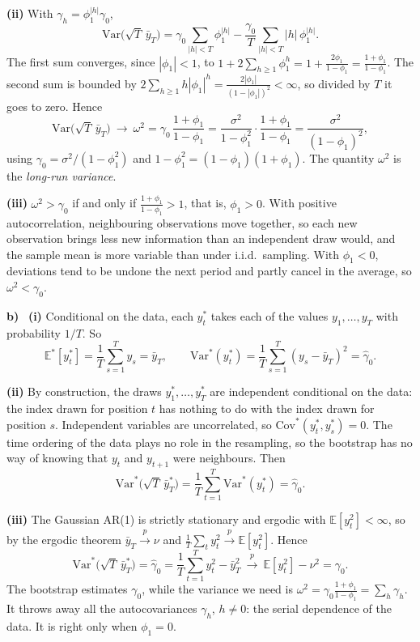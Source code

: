 \documentclass[11pt]{article}
\newcommand{\E}{\mathbb{E}}
\newcommand{\Var}{\mathrm{Var}}
\newcommand{\Cov}{\mathrm{Cov}}
\newcommand{\itm}[1]{\par\textbf{#1)}\ }
\begin{document}
\textbf{(ii)} With $\gamma_h=\phi_1^{|h|}\gamma_0$,
\[
\Var\big(\sqrt T\,\bar y_T\big) = \gamma_0\sum_{|h|<T}\phi_1^{|h|} - \frac{\gamma_0}T\sum_{|h|<T}|h|\,\phi_1^{|h|}.
\]
The first sum converges, since $|\phi_1|<1$, to $1+2\sum_{h\ge1}\phi_1^h = 1+\frac{2\phi_1}{1-\phi_1} = \frac{1+\phi_1}{1-\phi_1}$. The second sum is bounded by $2\sum_{h\ge1}h|\phi_1|^h = \frac{2|\phi_1|}{(1-|\phi_1|)^2}<\infty$, so divided by $T$ it goes to zero. Hence
\[
\Var\big(\sqrt T\,\bar y_T\big)\ \longrightarrow\ \omega^2 = \gamma_0\,\frac{1+\phi_1}{1-\phi_1} = \frac{\sigma^2}{1-\phi_1^2}\cdot\frac{1+\phi_1}{1-\phi_1} = \frac{\sigma^2}{(1-\phi_1)^2},
\]
using $\gamma_0=\sigma^2/(1-\phi_1^2)$ and $1-\phi_1^2=(1-\phi_1)(1+\phi_1)$. The quantity $\omega^2$ is the \emph{long-run variance}.

\textbf{(iii)} $\omega^2>\gamma_0$ if and only if $\frac{1+\phi_1}{1-\phi_1}>1$, that is, $\phi_1>0$. With positive autocorrelation, neighbouring observations move together, so each new observation brings less new information than an independent draw would, and the sample mean is more variable than under i.i.d.\ sampling. With $\phi_1<0$, deviations tend to be undone the next period and partly cancel in the average, so $\omega^2<\gamma_0$.

\itm{b}
\textbf{(i)} Conditional on the data, each $y^*_t$ takes each of the values $y_1,\dots,y_T$ with probability $1/T$. So
\[
\E^*[y^*_t] = \frac1T\sum_{s=1}^Ty_s = \bar y_T,\qquad \Var^*(y^*_t) = \frac1T\sum_{s=1}^T(y_s-\bar y_T)^2 = \hat\gamma_0 .
\]

\textbf{(ii)} By construction, the draws $y^*_1,\dots,y^*_T$ are independent conditional on the data: the index drawn for position $t$ has nothing to do with the index drawn for position $s$. Independent variables are uncorrelated, so $\Cov^*(y^*_t,y^*_s)=0$. The time ordering of the data plays no role in the resampling, so the bootstrap has no way of knowing that $y_t$ and $y_{t+1}$ were neighbours. Then
\[
\Var^*\big(\sqrt T\,\bar y^*_T\big) = \frac1T\sum_{t=1}^T\Var^*(y^*_t) = \hat\gamma_0 .
\]

\textbf{(iii)} The Gaussian AR(1) is strictly stationary and ergodic with $\E[y_t^2]<\infty$, so by the ergodic theorem $\bar y_T\xrightarrow{p}\nu$ and $\frac1T\sum_ty_t^2\xrightarrow{p}\E[y_t^2]$. Hence
\[
\Var^*\big(\sqrt T\,\bar y^*_T\big) = \hat\gamma_0 = \frac1T\sum_{t=1}^Ty_t^2-\bar y_T^2\ \xrightarrow{p}\ \E[y_t^2]-\nu^2 = \gamma_0 .
\]
The bootstrap estimates $\gamma_0$, while the variance we need is $\omega^2 = \gamma_0\frac{1+\phi_1}{1-\phi_1} = \sum_h\gamma_h$. It throws away all the autocovariances $\gamma_h$, $h\neq0$: the serial dependence of the data. It is right only when $\phi_1=0$.
\end{document}
